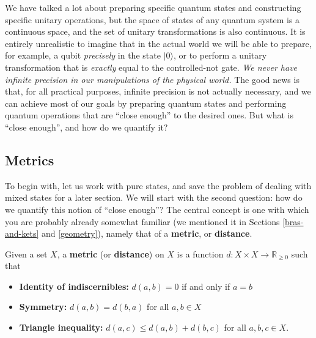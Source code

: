 \documentclass[fleqn]{article}
\providecommand{\tightlist}{%
  \setlength{\itemsep}{0pt}\setlength{\parskip}{0pt}}
\newenvironment{idea}{\noindent}{\medskip}
\begin{document}
We have talked a lot about preparing specific quantum states and constructing specific unitary operations, but the space of states of any quantum system is a continuous space, and the set of unitary transformations is also continuous.
It is entirely unrealistic to imagine that in the actual world we will be able to prepare, for example, a qubit \emph{precisely} in the state \(|0\rangle\), or to perform a unitary transformation that is \emph{exactly} equal to the controlled-not gate.
\emph{We never have infinite precision in our manipulations of the physical world.}
The good news is that, for all practical purposes, infinite precision is not actually necessary, and we can achieve most of our goals by preparing quantum states and performing quantum operations that are ``close enough'' to the desired ones.
But what is ``close enough'', and how do we quantify it?

\hypertarget{metrics}{%
\subsection{Metrics}\label{metrics}}

To begin with, let us work with pure states, and save the problem of dealing with mixed states for a later section.
We will start with the second question: how do we quantify this notion of ``close enough''?
The central concept is one with which you are probably already somewhat familiar (we mentioned it in Sections \ref{bras-and-kets} and \ref{geometry}), namely that of a \textbf{metric}, or \textbf{distance}.

\begin{idea}

Given a set \(X\), a \textbf{metric} (or \textbf{distance}) on \(X\) is a function \(d\colon X\times X\to\mathbb{R}_{\geqslant 0}\) such that

\begin{itemize}
\tightlist
\item
  \textbf{Identity of indiscernibles:} \(d(a,b)=0\) if and only if \(a=b\)
\item
  \textbf{Symmetry:} \(d(a,b)=d(b,a)\) for all \(a,b\in X\)
\item
  \textbf{Triangle inequality:} \(d(a,c)\leqslant d(a,b)+d(b,c)\) for all \(a,b,c\in X\).
\end{itemize}

\end{idea}
\end{document}
